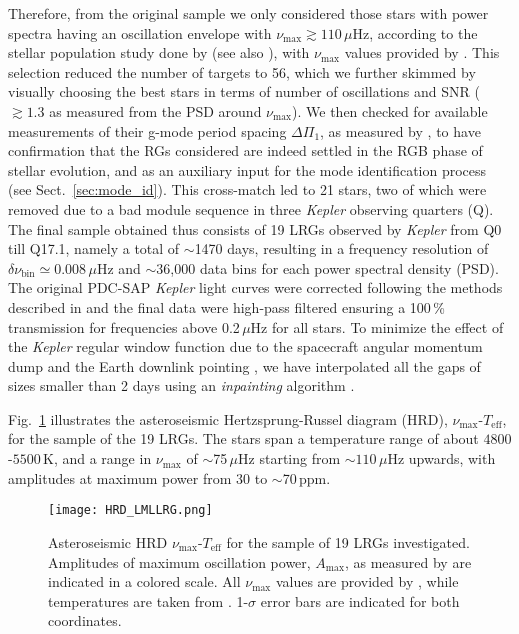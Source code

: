 \documentclass[structabstract]{aa}
\newcommand{\kepler}{\textit{Kepler} }
\newcommand{\numax}{\nu_\mathrm{max}}
\newcommand{\muhz}{$\mu$Hz}
\newcommand{\teff}{T_\mathrm{eff}}
\begin{document}
Therefore, from the original sample we only considered those stars with power spectra having an oscillation envelope with $\numax \gtrsim 110$\,\muhz, according to the stellar population study done by \cite{Miglio09} (see also \citealt{Bedding10}), with $\numax$ values provided by \cite{Huber11}. This selection reduced the number of targets to 56, which we further skimmed by visually choosing the best stars in terms of number of oscillations and SNR ($\gtrsim 1.3$ as measured from the PSD around $\numax$). We then checked for available measurements of their g-mode period spacing $\Delta\Pi_1$, as measured by \cite{Mosser12}, to have confirmation that the RGs considered are indeed settled in the RGB phase of stellar evolution, and as an auxiliary input for the mode identification process (see Sect.~\ref{sec:mode_id}). This cross-match led to 21 stars, two of which were removed due to a bad module sequence in three \kepler observing quarters (Q). The final sample obtained thus consists of 19 LRGs observed by \kepler from Q0 till Q17.1, namely a total of $\sim$1470 days, resulting in a frequency resolution of $\delta \nu_\mathrm{bin}\simeq 0.008\,$\muhz\,\,and $\sim$36,000 data bins for each power spectral density (PSD). The original PDC-SAP \kepler light curves \citep{Thompson13} were corrected following the methods described in \cite{Garcia11} and the final data were high-pass filtered ensuring a 100\,\% transmission for frequencies above 0.2\,$\mu$Hz for all stars. To minimize the effect of the \kepler regular window function due to the spacecraft angular momentum dump and the Earth downlink pointing \citep{Garcia14}, we have interpolated all the gaps of sizes smaller than 2 days using an {\it inpainting} algorithm \citep{Mathur10,Pires14}.

Fig.~\ref{fig:hrd} illustrates the asteroseismic Hertzsprung-Russel diagram (HRD), $\numax$-$\teff$, for the sample of the 19 LRGs. The stars span a temperature range of about $4800$-$5500$\,K, and a range in $\numax$ of $\sim$75\,\muhz\,\,starting from $\sim110$\,\muhz\,\,upwards, with amplitudes at maximum power from 30 to $\sim$70\,ppm.

\begin{figure}
   \centering
   \texttt{[image: HRD\_LMLLRG.png]}
      \caption{Asteroseismic HRD $\numax$-$\teff$ for the sample of 19 LRGs investigated. Amplitudes of maximum oscillation power, $A_\mathrm{max}$, as measured by \cite{Huber11} are indicated in a colored scale. All $\numax$ values are provided by \cite{Huber11}, while temperatures are taken from \cite{Pin12}. 1-$\sigma$ error bars are indicated for both coordinates.}
    \label{fig:hrd}
\end{figure}
\end{document}
